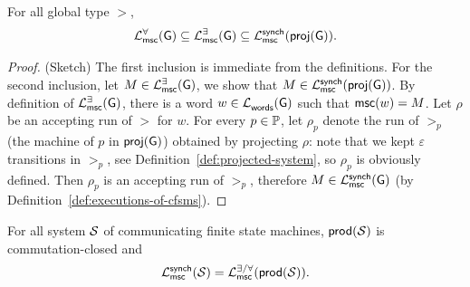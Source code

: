 




\begin{proposition}\label{prop:universal-existential-synch-inclusion}
    For all global type $\gt$, 
    $$
    \mathcal{L}_{\mathsf{msc}}^{\forall}(\mathsf{G}) \subseteq \mathcal{L}_{\mathsf{msc}}^{\exists}(\mathsf{G}) \subseteq \mathcal{L}_{\mathsf{msc}}^{\mathsf{synch}}(\mathsf{proj}(\mathsf{G})).
    $$
\end{proposition}

\begin{proof}(Sketch)
    The first inclusion is immediate from the definitions.
    For the second inclusion, let $M\in \mathcal{L}_{\mathsf{msc}}^{\exists}(\mathsf{G})$, we show that $M\in\mathcal{L}_{\mathsf{msc}}^{\mathsf{synch}}(\mathsf{proj}(\mathsf{G}))$.
    By definition of $\mathcal{L}_{\mathsf{msc}}^{\exists}(\mathsf{G})$, there is a word $w\in\mathcal{L}_{\mathsf{words}}^{}(\mathsf{G})$ such that
    $\mathsf{msc}(w)=M$. Let $\rho$ be an accepting run of $\gt$ for $w$. For every $p\in\mathbb{P}$, let $\rho_p$ denote the run of $\gt_p$ (the machine of $p$ in 
    $\mathsf{proj}(\mathsf{G})$) obtained by projecting $\rho$: note that we kept $\varepsilon$ transitions in $\gt_p$, see Definition~\ref{def:projected-system},
    so $\rho_p$ is obviously defined. Then $\rho_p$ is an accepting run of $\gt_p$, therefore 
    $M\in\mathcal{L}_{\mathsf{msc}}^{\mathsf{synch}}(\mathsf{G})$ (by Definition~\ref{def:executions-of-cfsms}).
\end{proof}

\begin{proposition}\label{prop:product-is-commutation-closed}
    For all system $\mathcal{S}$ of communicating finite state machines, 
    $\mathsf{prod}(\mathcal{S})$ is commutation-closed and
    $$
    \mathcal{L}_{\mathsf{msc}}^{\mathsf{synch}}(\mathcal{S}) = \mathcal{L}_{\mathsf{msc}}^{\exists/\forall}(\mathsf{prod}(\mathcal{S})).
    $$
\end{proposition}

